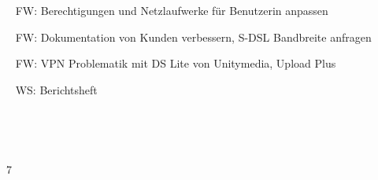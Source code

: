 {{	\textbullet~ FW: Berechtigungen und Netzlaufwerke für Benutzerin anpassen\par
	\textbullet~ FW: Dokumentation von Kunden verbessern, S-DSL Bandbreite anfragen\par
	\textbullet~ FW: VPN Problematik mit DS Lite von Unitymedia, Upload Plus\par
	\textbullet~ WS: Berichtsheft\par
	\textbullet~ \par
	\textbullet~ 
	}{}{7}
}{}
\Unterschrift
\newpage
